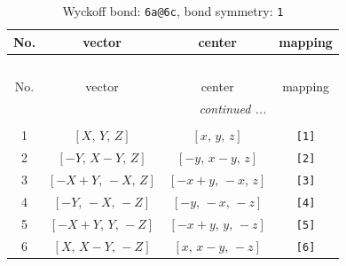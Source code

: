 \documentclass[fleqn,8pt]{jsarticle}
\begin{document}
\begin{longtable}{cccc}
\caption{Wyckoff bond: {\tt 6a@6c}, bond symmetry: {\tt 1}}
 \\
 \hline \hline
No. & vector & center & mapping \\ \hline \endfirsthead

\multicolumn{3}{l}{\tablename\ \thetable{}} \\
 \hline \hline
No. & vector & center & mapping \\ \hline \endhead

 \hline \hline
\multicolumn{3}{r}{\footnotesize\it continued ...} \\ \endfoot

 \hline \hline
\multicolumn{3}{r}{} \\ \endlastfoot

1 & $\left[ X,\, Y,\, Z \right]$ & $\left[ x,\, y,\, z \right]$ & {\tt [1]} \\ \hline
2 & $\left[ - Y,\, X - Y,\, Z \right]$ & $\left[ - y,\, x - y,\, z \right]$ & {\tt [2]} \\ \hline
3 & $\left[ - X + Y,\, - X,\, Z \right]$ & $\left[ - x + y,\, - x,\, z \right]$ & {\tt [3]} \\ \hline
4 & $\left[ - Y,\, - X,\, - Z \right]$ & $\left[ - y,\, - x,\, - z \right]$ & {\tt [4]} \\ \hline
5 & $\left[ - X + Y,\, Y,\, - Z \right]$ & $\left[ - x + y,\, y,\, - z \right]$ & {\tt [5]} \\ \hline
6 & $\left[ X,\, X - Y,\, - Z \right]$ & $\left[ x,\, x - y,\, - z \right]$ & {\tt [6]} \\
\end{longtable}
\end{document}
